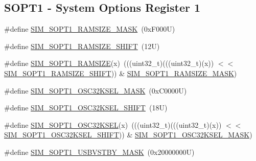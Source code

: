 \subsection*{S\+O\+P\+T1 -\/ System Options Register 1}
\begin{DoxyCompactItemize}
\item 
\#define \mbox{\hyperlink{group___s_i_m___register___masks_ga9fbcfd0b3e4fb08ee733dee975a5df29}{S\+I\+M\+\_\+\+S\+O\+P\+T1\+\_\+\+R\+A\+M\+S\+I\+Z\+E\+\_\+\+M\+A\+SK}}~(0x\+F000\+U)
\item 
\#define \mbox{\hyperlink{group___s_i_m___register___masks_ga4100f9e8e8ffc766ac1ac6493379b8dc}{S\+I\+M\+\_\+\+S\+O\+P\+T1\+\_\+\+R\+A\+M\+S\+I\+Z\+E\+\_\+\+S\+H\+I\+FT}}~(12\+U)
\item 
\#define \mbox{\hyperlink{group___s_i_m___register___masks_ga4cd929a0204fbf30ba60cc0899ad039d}{S\+I\+M\+\_\+\+S\+O\+P\+T1\+\_\+\+R\+A\+M\+S\+I\+ZE}}(x)~(((uint32\+\_\+t)(((uint32\+\_\+t)(x)) $<$$<$ \mbox{\hyperlink{group___s_i_m___register___masks_ga4100f9e8e8ffc766ac1ac6493379b8dc}{S\+I\+M\+\_\+\+S\+O\+P\+T1\+\_\+\+R\+A\+M\+S\+I\+Z\+E\+\_\+\+S\+H\+I\+FT}})) \& \mbox{\hyperlink{group___s_i_m___register___masks_ga9fbcfd0b3e4fb08ee733dee975a5df29}{S\+I\+M\+\_\+\+S\+O\+P\+T1\+\_\+\+R\+A\+M\+S\+I\+Z\+E\+\_\+\+M\+A\+SK}})
\item 
\#define \mbox{\hyperlink{group___s_i_m___register___masks_ga5c660cd4a6d8062e6ef4afbc17c27fa4}{S\+I\+M\+\_\+\+S\+O\+P\+T1\+\_\+\+O\+S\+C32\+K\+S\+E\+L\+\_\+\+M\+A\+SK}}~(0x\+C0000\+U)
\item 
\#define \mbox{\hyperlink{group___s_i_m___register___masks_gac9e930c4ee375a2aee6fa6c97e061226}{S\+I\+M\+\_\+\+S\+O\+P\+T1\+\_\+\+O\+S\+C32\+K\+S\+E\+L\+\_\+\+S\+H\+I\+FT}}~(18\+U)
\item 
\#define \mbox{\hyperlink{group___s_i_m___register___masks_gaf89520e7506a3dec707983ab729aef08}{S\+I\+M\+\_\+\+S\+O\+P\+T1\+\_\+\+O\+S\+C32\+K\+S\+EL}}(x)~(((uint32\+\_\+t)(((uint32\+\_\+t)(x)) $<$$<$ \mbox{\hyperlink{group___s_i_m___register___masks_gac9e930c4ee375a2aee6fa6c97e061226}{S\+I\+M\+\_\+\+S\+O\+P\+T1\+\_\+\+O\+S\+C32\+K\+S\+E\+L\+\_\+\+S\+H\+I\+FT}})) \& \mbox{\hyperlink{group___s_i_m___register___masks_ga5c660cd4a6d8062e6ef4afbc17c27fa4}{S\+I\+M\+\_\+\+S\+O\+P\+T1\+\_\+\+O\+S\+C32\+K\+S\+E\+L\+\_\+\+M\+A\+SK}})
\item 
\#define \mbox{\hyperlink{group___s_i_m___register___masks_gaaf0b406e4bd1800083f48727a7cde829}{S\+I\+M\+\_\+\+S\+O\+P\+T1\+\_\+\+U\+S\+B\+V\+S\+T\+B\+Y\+\_\+\+M\+A\+SK}}~(0x20000000\+U)
\item 

\end{DoxyCompactItemize}
